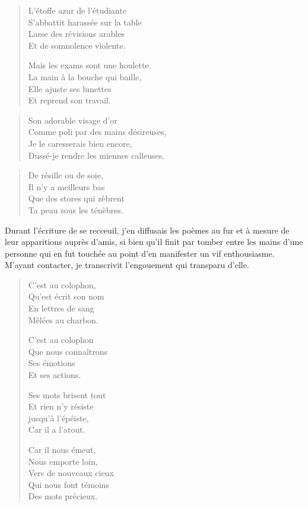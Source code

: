 \begin{verse}
L’étoffe azur de l’étudiante\\
S’abbattit harassée sur la table\\
Lasse des révisions arables\\
Et de somnolence violente.

Mais les exams sont  une houlette.\\
La main à la bouche qui baille,\\
Elle ajuste ses lunettes\\
Et reprend son travail.
\end{verse}

\begin{verse}
Son adorable visage d’or\\
Comme poli par des mains désireuses,\\
Je le caresserais bien encore,\\
Dussé-je rendre les miennes calleuses.
\end{verse}

\begin{verse}
De résille ou de soie,\\
Il n’y a meilleurs bas\\
Que des stores qui zèbrent\\
Ta peau sous les ténèbres.
\end{verse}


\begin{prose}
Durant l’écriture de se recceuil, j’en diffusais les poèmes au fur et à mesure de leur apparitions auprès d’amis, si bien qu’il finit par tomber entre les mains d’une personne qui en fut touchée au point d’en manifester un vif enthousiasme.
M’ayant contacter, je transcrivit l’engouement qui transparu d’elle.

\end{prose}
\begin{verse}
C’est au colophon,\\
Qu’est écrit son nom\\
En lettres de sang\\
Mêlées au charbon.

C’est au colophon\\
Que nous connaîtrons\\
Ses émotions\\
Et ses actions.

Ses mots brisent tout\\
Et rien n’y résiste\\
jusqu’à l’épéiste,\\
Car il a l’atout.

Car il nous émeut,\\
Nous emporte loin,\\
Vers de nouveaux cieux\\
Qui nous font témoins\\
Des mots précieux.
\end{verse}


